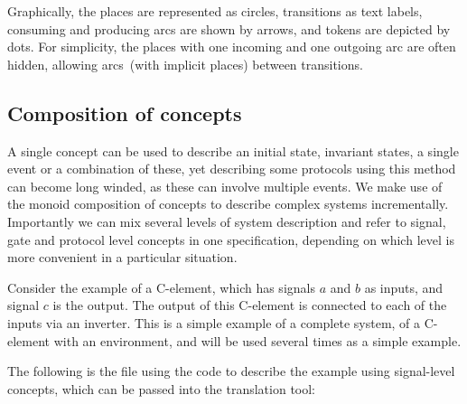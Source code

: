 \documentclass[british,compsoc]{IEEEtran}
\begin{document}
Graphically, the places are represented as circles, transitions as
text labels, consuming and producing arcs are shown by arrows, and
tokens are depicted by dots. For simplicity, the places with one incoming
and one outgoing arc are often hidden, allowing arcs~(with implicit
places) between transitions.


\subsection{Composition of concepts \label{sub:Comp-of-concepts}}



A single concept can be used to describe an initial state, invariant
states, a single event or a combination of these, yet describing some
protocols using this method can become long winded, as these can involve
multiple events. We make use of the monoid composition of concepts
to describe complex systems incrementally. Importantly we can mix
several levels of system description and refer to signal, gate and
protocol level concepts in one specification, depending on which level
is more convenient in a particular situation.

Consider the example of a C-element, which has signals $a$ and $b$ as inputs,
and signal $c$ is the output. The output of this C-element is connected to
each of the inputs via an inverter. This is a simple example of a complete
system, of a C-element with an environment, and will be used several
times as a simple example.

The following is the file using the code to describe the example using signal-level concepts, which can be passed into
the translation tool:
\end{document}
